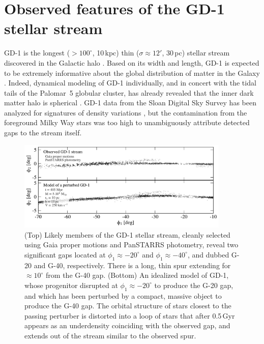 \documentclass[twocolumn]{aastex62}
\begin{document}
\section{Observed features of the GD-1 stellar stream}
\label{sec:data}
GD-1 is the longest ($>100^\circ$, 10\,kpc) thin ($\sigma\approx12'$, 30\,pc) stellar stream discovered in the Galactic halo \citep{gd2006}.
Based on its width and length, GD-1 is expected to be extremely informative about the global distribution of matter in the Galaxy \citep{lux2013, bh2018}.
Indeed, dynamical modeling of GD-1 individually, and in concert with the tidal tails of the Palomar~5 globular cluster, has already revealed that the inner dark matter halo is spherical \citep{koposov2010, bowden2015, bovy2016}.
GD-1 data from the Sloan Digital Sky Survey \citep[SDSS,][]{york2000} has been analyzed for signatures of density variations \citep{cg2013}, but the contamination from the foreground Milky Way stars was too high to unambiguously attribute detected gaps to the stream itself.

\begin{figure}
\begin{center}
\includegraphics[width=0.9\textwidth]{stream_encounter.pdf}
\end{center}
\caption{(Top) Likely members of the GD-1 stellar stream, cleanly selected using Gaia proper motions and PanSTARRS photometry, reveal two significant gaps located at $\phi_1\approx-20^\circ$ and $\phi_1\approx-40^\circ$, and dubbed G-20 and G-40, respectively.
There is a long, thin spur extending for $\approx10^\circ$ from the G-40 gap.
(Bottom) An idealized model of GD-1, whose progenitor disrupted at $\phi_1\approx-20^\circ$ to produce the G-20 gap, and which has been perturbed by a compact, massive object to produce the G-40 gap.
The orbital structure of stars closest to the passing perturber is distorted into a loop of stars that after 0.5\,Gyr appears as an underdensity coinciding with the observed gap, and extends out of the stream similar to the observed spur.
}
\label{fig:fiducial}
\end{figure}
\end{document}
